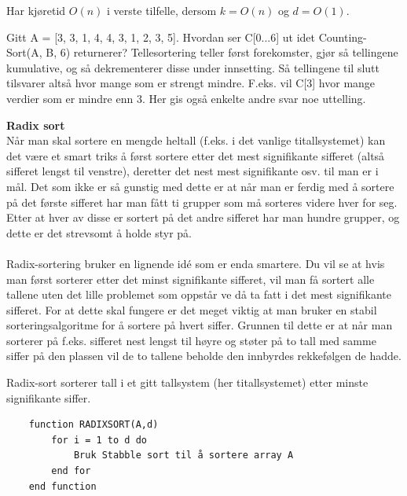 \noindent Har kjøretid $O(n)$ i verste tilfelle, dersom $k = O(n)$ og $d = O(1)$.\\

\begin{boxed}
Gitt A = [3, 3, 1, 4, 4, 3, 1, 2, 3, 5]. Hvordan ser C[0...6] ut idet Counting-Sort(A, B, 6) returnerer?
\newline\newline
[0, 0, 2, 3, 7, 9, 10] \newline\newline  Tellesortering teller først forekomster, gjør så tellingene kumulative, og så dekrementerer disse under innsetting. Så tellingene til slutt tilsvarer altså hvor mange som er strengt mindre. F.eks. vil C[3] hvor mange verdier som er mindre enn 3. Her gis også enkelte andre svar noe uttelling.
\end{boxed}

\noindent \textbf{Radix sort}\\
Når man skal sortere en mengde heltall (f.eks. i det vanlige titallsystemet) kan det være et smart triks å først sortere etter det mest signifikante sifferet (altså sifferet lengst til venstre), deretter det nest mest signifikante osv. til man er i mål. Det som ikke er så gunstig med dette er at når man er ferdig med å sortere på det første sifferet har man fått ti grupper som må sorteres videre hver for seg. Etter at hver av disse er sortert på det andre sifferet har man hundre grupper, og dette er det strevsomt å holde styr på.
\\\\
Radix-sortering bruker en lignende idé som er enda smartere. Du vil se at hvis man først sorterer etter det minst signifikante sifferet, vil man få sortert alle tallene uten det lille problemet som oppstår ve då ta fatt i det mest signifikante sifferet. For at dette skal fungere er det meget viktig at man bruker en stabil sorteringsalgoritme for å sortere på hvert siffer. Grunnen til dette er at når man sorterer på f.eks. sifferet nest lengst til høyre og støter på to tall med samme siffer på den plassen vil de to tallene beholde den innbyrdes rekkefølgen de hadde. %

Radix-sort sorterer tall i et gitt tallsystem (her titallsystemet) etter minste signifikante siffer.

\begin{lstlisting}
    function RADIXSORT(A,d)
    	for i = 1 to d do
    		Bruk Stabble sort til å sortere array A
    	end for
    end function
\end{lstlisting}

